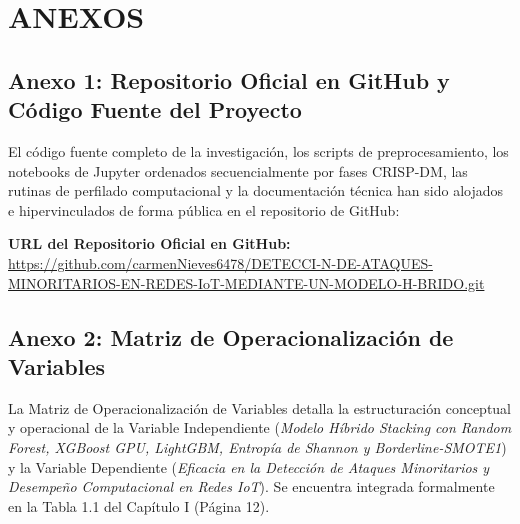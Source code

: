 \chapter*{ANEXOS}

\section*{Anexo 1: Repositorio Oficial en GitHub y Código Fuente del Proyecto}
El código fuente completo de la investigación, los scripts de preprocesamiento, los notebooks de Jupyter ordenados secuencialmente por fases CRISP-DM, las rutinas de perfilado computacional y la documentación técnica han sido alojados e hipervinculados de forma pública en el repositorio de GitHub:

\vspace{0.5em}
\noindent \textbf{URL del Repositorio Oficial en GitHub:} \\
\url{https://github.com/carmenNieves6478/DETECCI-N-DE-ATAQUES-MINORITARIOS-EN-REDES-IoT-MEDIANTE-UN-MODELO-H-BRIDO.git}

\vspace{0.8em}
\section*{Anexo 2: Matriz de Operacionalización de Variables}
La Matriz de Operacionalización de Variables detalla la estructuración conceptual y operacional de la Variable Independiente (\textit{Modelo Híbrido Stacking con Random Forest, XGBoost GPU, LightGBM, Entropía de Shannon y Borderline-SMOTE1}) y la Variable Dependiente (\textit{Eficacia en la Detección de Ataques Minoritarios y Desempeño Computacional en Redes IoT}). Se encuentra integrada formalmente en la Tabla 1.1 del Capítulo I (Página 12).

\vspace{0.8em}
